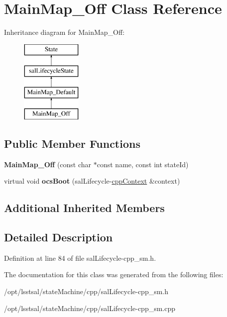\hypertarget{class_main_map___off}{\section{Main\-Map\-\_\-\-Off Class Reference}
\label{class_main_map___off}
}
Inheritance diagram for Main\-Map\-\_\-\-Off\-:\begin{figure}[H]
\begin{center}
\leavevmode
\includegraphics[height=4.000000cm]{class_main_map___off}
\end{center}
\end{figure}
\subsection*{Public Member Functions}
\begin{DoxyCompactItemize}
\item 
\hypertarget{class_main_map___off_aa3e9af24237a529b03889d60940e0978}{{\bfseries Main\-Map\-\_\-\-Off} (const char $\ast$const name, const int state\-Id)}\label{class_main_map___off_aa3e9af24237a529b03889d60940e0978}

\item 
\hypertarget{class_main_map___off_a4a3455c2ffd13127617567c9d617e898}{virtual void {\bfseries ocs\-Boot} (sal\-Lifecycle-\/\hyperlink{classcpp_context}{cpp\-Context} \&context)}\label{class_main_map___off_a4a3455c2ffd13127617567c9d617e898}

\end{DoxyCompactItemize}
\subsection*{Additional Inherited Members}


\subsection{Detailed Description}


Definition at line 84 of file sal\-Lifecycle-\/cpp\-\_\-sm.\-h.



The documentation for this class was generated from the following files\-:\begin{DoxyCompactItemize}
\item 
/opt/lsstsal/state\-Machine/cpp/sal\-Lifecycle-\/cpp\-\_\-sm.\-h\item 
/opt/lsstsal/state\-Machine/cpp/sal\-Lifecycle-\/cpp\-\_\-sm.\-cpp\end{DoxyCompactItemize}
